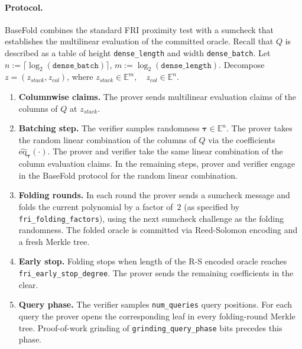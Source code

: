 \documentclass[11pt]{article}
\begin{document}
\paragraph{Protocol.}
BaseFold combines the standard FRI proximity test with a sumcheck
that establishes the multilinear evaluation of the committed oracle.
Recall that $Q$ is described as a table of height \texttt{dense\_length}
and width \texttt{dense\_batch}.
Let $n:=\lceil\log_2(\texttt{dense\_batch})\rceil$, $m:=\log_2(\texttt{dense\_length})$.
Decompose $z=(z_{stack}, z_{col})$, where $z_{stack}\in \mathbb{E}^m,\quad z_{col}\in \mathbb{E}^n$.
\begin{enumerate}
\item \textbf{Columnwise claims.} The prover sends multilinear evaluation claims of the columns of $Q$
at $z_{stack}$.
\item \textbf{Batching step.} The verifier samples randomness $\mathbf{\tau}\in \mathbb{E}^n$.
The prover takes the random linear combination of the columns of $Q$ via the coefficients $\hat{\mathrm{eq}}_{\mathbf{\tau}}(\cdot)$.
The prover and verifier take the same linear combination of the column evaluation claims.
In the remaining steps, prover and verifier engage in the BaseFold protocol for the random linear combination.
\item \textbf{Folding rounds.}
      In each round the prover sends a sumcheck message and folds the current polynomial by a factor of~$2$
      (as specified by \texttt{fri\_folding\_factors}),
      using the next sumcheck challenge as the folding randomness.
      The folded oracle is committed via Reed-Solomon encoding and a fresh Merkle tree.
\item \textbf{Early stop.}
      Folding stops when length of the R-S encoded oracle reaches
      \texttt{fri\_early\_stop\_degree}.
      The prover sends the remaining coefficients in the clear.
\item \textbf{Query phase.}
      The verifier samples \texttt{num\_queries} query positions.
      For each query the prover opens the corresponding leaf in every
      folding-round Merkle tree.
      Proof-of-work grinding of \texttt{grinding\_query\_phase} bits
      precedes this phase.
\end{enumerate}



\end{document}
